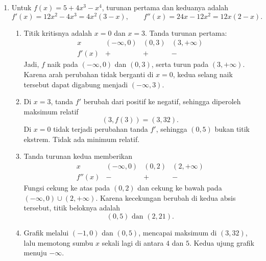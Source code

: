 \documentclass[11pt,a4paper]{article}
\begin{document}
\begin{enumerate}
        \begin{align*}
            C(4\sqrt[3]{60}) &= 8.000(4\sqrt[3]{60})^2 + \frac{61.440.000}{4\sqrt[3]{60}} \\
            &= 8.000\cdot 16\cdot 60^{2/3} + \frac{61.440.000}{4\sqrt[3]{60}} \\
            &= 128.000\cdot 60^{2/3} + \frac{61.440.000}{4\sqrt[3]{60}} \\
            &= \boxed{768000\sqrt[3]{450}}
        \end{align*}
        \newpage
        \item Untuk $f(x)=5+4x^3-x^4$, turunan pertama dan keduanya adalah
        \[
            f'(x)=12x^2-4x^3=4x^2(3-x),
            \qquad f''(x)=24x-12x^2=12x(2-x).
        \]
        \begin{enumerate}
            \item Titik kritisnya adalah $x=0$ dan $x=3$. Tanda turunan pertama:
            \[
                \begin{array}{c|ccc}
                    x&(-\infty,0)&(0,3)&(3,+\infty)\\ \hline
                    f'(x)&+&+&-
                \end{array}
            \]
            Jadi, $f$ naik pada $(-\infty,0)$ dan $(0,3)$, serta turun pada $(3,+\infty)$. Karena arah perubahan tidak berganti di $x=0$, kedua selang naik tersebut dapat digabung menjadi $(-\infty,3)$.
            \item Di $x=3$, tanda $f'$ berubah dari positif ke negatif, sehingga diperoleh maksimum relatif
            \[
                \boxed{(3,f(3))=(3,32)}.
            \]
            Di $x=0$ tidak terjadi perubahan tanda $f'$, sehingga $(0,5)$ bukan titik ekstrem. Tidak ada minimum relatif.
            \item Tanda turunan kedua memberikan
            \[
                \begin{array}{c|ccc}
                    x&(-\infty,0)&(0,2)&(2,+\infty)\\ \hline
                    f''(x)&-&+&-
                \end{array}
            \]
            Fungsi cekung ke atas pada $(0,2)$ dan cekung ke bawah pada $(-\infty,0)\cup(2,+\infty)$. Karena kecekungan berubah di kedua absis tersebut, titik beloknya adalah
            \[
                \boxed{(0,5)\text{ dan }(2,21)}.
            \]
            \item Grafik melalui $(-1,0)$ dan $(0,5)$, mencapai maksimum di $(3,32)$, lalu memotong sumbu $x$ sekali lagi di antara $4$ dan $5$. Kedua ujung grafik menuju $-\infty$.

\end{enumerate}
\end{enumerate}
\end{document}
